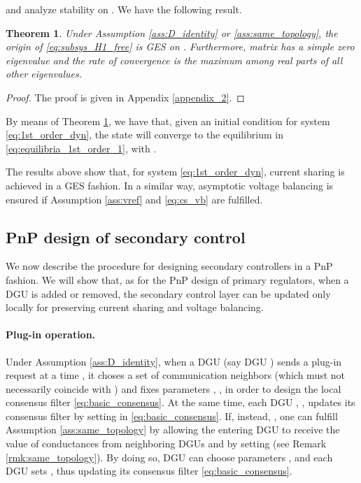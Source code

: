 \documentclass[a4paper]{article}
\theoremstyle{plain}
\newtheorem{theorem}{Theorem}
\begin{document}
and analyze stability on . We have the following result.
\begin{theorem}
	\label{thm:stability_1st_order}
	Under Assumption \ref{ass:D_identity} or \ref{ass:same_topology}, the origin of \eqref{eq:subsys_H1_free} is GES on . Furthermore, matrix  has a simple zero eigenvalue and the rate of convergence is the maximum among real parts of all other eigenvalues.
\end{theorem}
\begin{proof}
	The proof is given in Appendix \ref{appendix_2}.
\end{proof}
By means of Theorem \ref{thm:stability_1st_order}, we have that, given
an initial condition  for system
\eqref{eq:1st_order_dyn}, the state 
will converge to the equilibrium in \eqref{eq:equilibria_1st_order_1},
with .

The results above show that, for system \eqref{eq:1st_order_dyn}, current sharing is achieved in a GES fashion. In a similar way,  asymptotic voltage
balancing is ensured if Assumption
\ref{ass:vref} and \eqref{eq:cs_vb} are fulfilled.

\subsection{PnP design of secondary control}
\label{sec:pnp_sec_ctrl}
We now describe the procedure for designing secondary controllers in a PnP fashion. We will show that, as for the PnP design of primary regulators, when a DGU is added or removed, the secondary control layer can be updated only locally for preserving current sharing and voltage balancing.

\paragraph{Plug-in operation.} Under Assumption \ref{ass:D_identity}, when a DGU (say DGU ) sends a plug-in request at a time , it choses a
set  of communication neighbors (which must not necessarily coincide with ) and fixes parameters , , in order to design the local consensus filter
\eqref{eq:basic_consensus}. At the same time, each DGU , , updates its consensus filter by setting  in \eqref{eq:basic_consensus}. If, instead, , one can fulfill Assumption \ref{ass:same_topology} by allowing the entering DGU to receive the value of conductances  from neighboring DGUs  and by setting   (see Remark \ref{rmk:same_topology}). By doing so, DGU  can choose parameters , and each DGU  sets , thus updating its consensus filter \eqref{eq:basic_consensus}.
\end{document}
